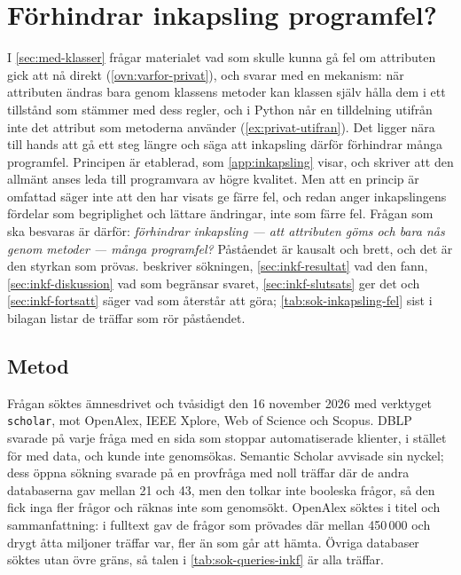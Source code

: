\chapter{Förhindrar inkapsling programfel?}
\label{app:inkapsling-fel}

I \cref{sec:med-klasser} frågar materialet vad som skulle kunna gå fel
om attributen gick att nå direkt (\cref{ovn:varfor-privat}), och svarar
med en mekanism: när attributen ändras bara genom klassens metoder kan
klassen själv hålla dem i ett tillstånd som stämmer med dess regler, och
i Python når en tilldelning utifrån inte det attribut som metoderna
använder (\cref{ex:privat-utifran}).  Det ligger nära till hands att gå
ett steg längre och säga att inkapsling därför förhindrar många
programfel.  Principen är etablerad, som \cref{app:inkapsling} visar, och
\textcite{Tempero2009Fields} skriver att den allmänt anses leda till
programvara av högre kvalitet.  Men att en princip är omfattad säger inte
att den har visats ge färre fel, och redan \textcite{Snyder1986} anger
inkapslingens fördelar som begriplighet och lättare ändringar, inte som
färre fel.  Frågan som ska besvaras är därför: \emph{förhindrar
inkapsling --- att attributen göms och bara nås genom metoder --- många
programfel?}  Påståendet är kausalt och brett, och det är den styrkan som
prövas.   beskriver sökningen,
\cref{sec:inkf-resultat} vad den fann, \cref{sec:inkf-diskussion} vad som
begränsar svaret, \cref{sec:inkf-slutsats} ger det och
\cref{sec:inkf-fortsatt} säger vad som återstår att göra;
\cref{tab:sok-inkapsling-fel} sist i bilagan listar de träffar som rör
påståendet.

\section{Metod}
\label{sec:inkf-metod}

Frågan söktes ämnesdrivet och tvåsidigt den 16 november 2026 med
verktyget \texttt{scholar}, mot OpenAlex, IEEE Xplore, Web of Science och
Scopus.  DBLP svarade på varje fråga med en sida som stoppar
automatiserade klienter, i stället för med data, och kunde inte
genomsökas.  Semantic Scholar avvisade sin nyckel; dess öppna sökning
svarade på en provfråga med noll träffar där de andra databaserna gav
mellan 21 och 43, men den tolkar inte booleska frågor, så den fick inga
fler frågor och räknas inte som genomsökt.  OpenAlex söktes i titel och
sammanfattning: i fulltext gav de frågor som prövades där mellan
450\,000 och drygt åtta miljoner träffar var, fler än som går att
hämta.  Övriga databaser söktes utan övre gräns, så talen i
\cref{tab:sok-queries-inkf} är alla
träffar.

